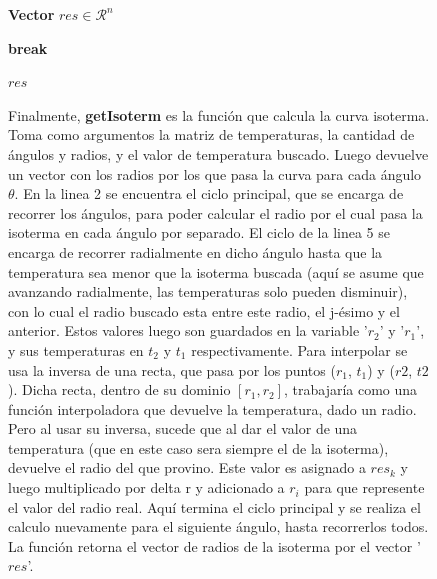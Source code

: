 \begin{figure}[!htb]
\centering
{}

\begin{algorithmic}[1]
      \State \textbf{Vector} $res \in \mathcal{R}^{n}$

      \For{$k \in [0, n)$}

	  \For{$j \in [0, m)$}
		  \State \textbf{break}
	      \EndIf
	  \EndFor


	  \EndIf



    \EndFor
    
    \State \Return $res$
  \EndFunction
\end{algorithmic}   

\endminipage\hfill
{}
\endminipage\hfill
{}

Finalmente, \textbf{getIsoterm} es la función que calcula la curva isoterma. Toma como argumentos la matriz de temperaturas, la cantidad de \'angulos y radios, y el valor de temperatura buscado. Luego devuelve un vector con los radios por los que pasa la curva para cada \'angulo $\theta$.
En la linea 2 se encuentra el ciclo principal, que se encarga de recorrer los \'angulos, para poder calcular el radio por el cual pasa la isoterma  en cada \'angulo por separado.  El ciclo de la linea 5 se encarga de recorrer radialmente en dicho \'angulo hasta que la temperatura sea menor que la isoterma buscada (aquí se asume que avanzando radialmente, las temperaturas solo pueden disminuir), con lo cual el radio buscado esta entre este radio, el j-ésimo y el anterior.  Estos valores luego son guardados en la variable '$r_2$' y '$r_1$', y sus temperaturas en $t_2$ y $t_1$ respectivamente.
Para interpolar se usa la inversa de una recta, que pasa por los puntos ($r_1$, $t_1$) y ($r2$, $t2$). Dicha recta, dentro de su dominio $[r_1,r_2]$, trabajar\'ia como una función interpoladora que devuelve la temperatura, dado un radio. Pero al usar su inversa, sucede que al dar el valor de una temperatura (que en este caso sera siempre el de la isoterma), devuelve el radio del que provino. Este valor es asignado a $res_{k}$ y luego multiplicado por delta r y adicionado a $r_{i}$ para que represente el valor del radio real.
Aquí termina el ciclo principal y se realiza el calculo nuevamente para el siguiente \'angulo, hasta recorrerlos todos. La función retorna el vector de radios de la isoterma por el vector '$res$'.

\endminipage\hfill
\end{figure}


